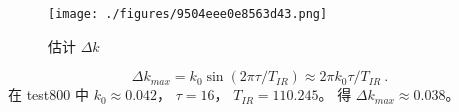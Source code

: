 \begin{figure}[ht]
\centering
\texttt{[image: ./figures/9504eee0e8563d43.png]}
\caption{估计 $\Delta k$} \label{fig_HeAnal_2}
\end{figure}
\begin{equation}
\Delta k_{max} = k_0 \sin(2\pi \tau/T_{IR}) \approx 2 \pi k_0  \tau/T_{IR}~.
\end{equation}
在 test800 中 $k_0 \approx 0.042$， $\tau = 16$， $T_{IR} = 110.245$。 得 $\Delta k_{max} \approx 0.038$。
